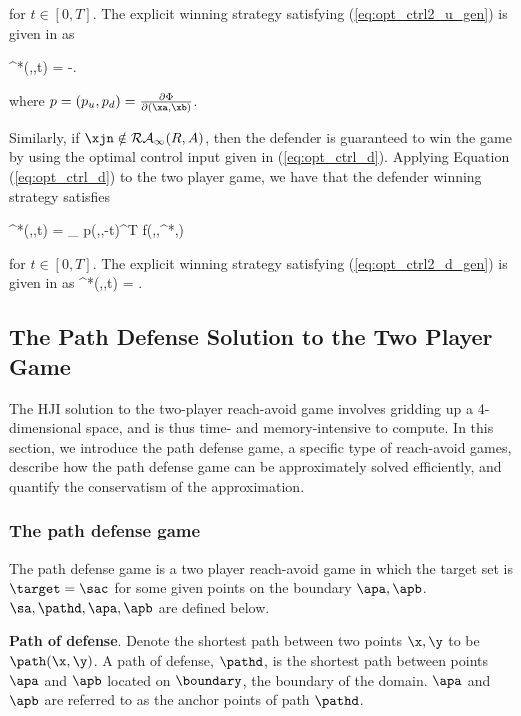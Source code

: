 \noindent for $t \in [0,T]$. The explicit winning strategy satisfying (\ref{eq:opt_ctrl2_u_gen}) is given in \cite{Huang2011} as

\bq \label{eq:opt_ctrl2_a}
\ca^*(\xa,\xb,t) = -\vela {}.
\eq

\noindent where $p = (p_u,p_d) = \frac{\partial \Phi}{\partial (\xa,\xb)}$.  

Similarly, if $\xjn\notin\mathcal{RA}_\infty(R,A)$, then the defender is guaranteed to win the game by using the optimal control input given in (\ref{eq:opt_ctrl_d}). Applying Equation (\ref{eq:opt_ctrl_d}) to the two player game, we have that the defender winning strategy satisfies 

\bq \label{eq:opt_ctrl2_d_gen}
  \cb^*(\xa,\xb,t) = \arg \max_{\cb \in {}} p(\xa,\xb,-t)^T f(\xa,\xb,\ca^*,\cb)
\eq

\noindent for $t \in [0,T]$. The explicit winning strategy satisfying (\ref{eq:opt_ctrl2_d_gen}) is given in \cite{Huang2011} as
\bq \label{eq:opt_ctrl2_d}
\cb^*(\xa,\xb,t) = \velb {}.
\eq

\subsection{The Path Defense Solution to the Two Player Game}
\label{sec:path_defense}
The HJI solution to the two-player reach-avoid game involves gridding up a 4-dimensional space, and is thus time- and memory-intensive to compute. In this section, we introduce the path defense game, a specific type of reach-avoid games, describe how the path defense game can be approximately solved efficiently, and quantify the conservatism of the approximation. 

\subsubsection{The path defense game}
The path defense game is a two player reach-avoid game in which the target set is $\target=\sac$ for some given points on the boundary $\apa,\apb$. $\sa,\pathd,\apa,\apb$ are defined below.

\begin{defn} %
\textbf{Path of defense}. Denote the shortest path between two points $\x,\y$ to be $\path(\x,\y)$. A path of defense, $\pathd$, is the shortest path between points $\apa$ and $\apb$ located on $\boundary$, the boundary of the domain. $\apa$ and $\apb$ are referred to as the anchor points of path $\pathd$. 
\end{defn}

